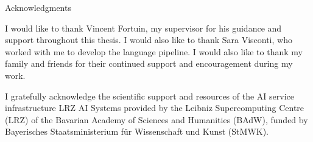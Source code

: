 \thispagestyle{empty}

\vspace*{20mm}

\begin{center}
    { Acknowledgments}
\end{center}

\vspace{10mm}

I would like to thank Vincent Fortuin, my supervisor for his guidance and support throughout this thesis. I would also like to thank Sara Visconti,
who worked with me to develop the language pipeline. I would also like to thank my family and friends for their continued support and encouragement during my work.

I gratefully acknowledge the scientific support and resources of the AI service infrastructure LRZ AI Systems provided by the 
Leibniz Supercomputing Centre (LRZ) of the Bavarian Academy of Sciences and Humanities (BAdW), funded by Bayerisches Staatsministerium für 
Wissenschaft und Kunst (StMWK).

\cleardoublepage{}
